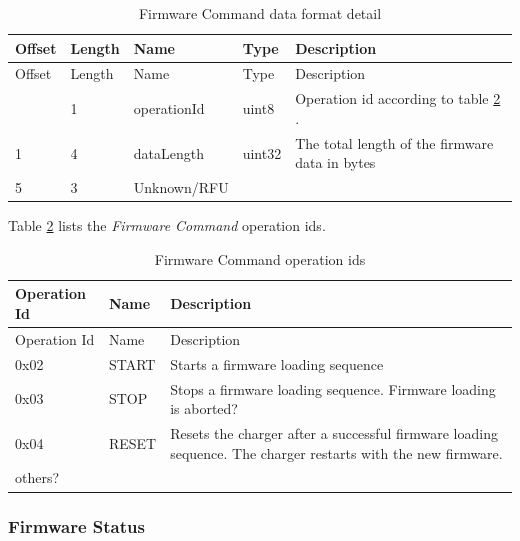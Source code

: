 \documentclass[a4paper]{article}
\newcommand{\secref}[1]{\ref{#1} \nameref{#1}}
\begin{document}
\hfill\break

\begin{longtable}[]{@{}llllp{10cm}@{}}
	\caption{Firmware Command data format detail}
	\label{table.70}
	\tabularnewline
	\toprule\noalign{}
	Offset & Length & Name        & Type   & Description                              \\
	\midrule\noalign{}
	\endfirsthead
	\toprule\noalign{}
	Offset & Length & Name        & Type   & Description                              \\
	\midrule\noalign{}
	\endhead
	\bottomrule\noalign{}
	\endlastfoot
	0      & 1      & operationId & uint8  & Operation id according to table          
	\secref{table.65}. \\
	1      & 4      & dataLength  & uint32 & The total length of the firmware data in 
	bytes \\
	5      & 3      & Unknown/RFU &        &                                          \\
\end{longtable}

Table \ref{table.65} lists the \emph{Firmware Command} operation id\textquotesingle s.

\begin{longtable}[]{@{}llp{13cm}@{}}
	\caption{Firmware Command operation ids}
	\label{table.65}
	\tabularnewline
	\toprule\noalign{}
	Operation Id & Name  & Description                                            \\
	\midrule\noalign{}
	\endfirsthead
	\toprule\noalign{}
	Operation Id & Name  & Description                                            \\
	\midrule\noalign{}
	\endhead
	\bottomrule\noalign{}
	\endlastfoot
	0x02         & START & Starts a firmware loading sequence                     \\
	0x03         & STOP  & Stops a firmware loading sequence. Firmware loading is aborted? \\
	0x04         & RESET & Resets the charger after a successful firmware loading sequence. 
    The charger restarts with the new firmware. \\
	others?      &       &                                                        \\
\end{longtable}

\subsubsection{Firmware Status}
\label{firmware_status}
\end{document}
